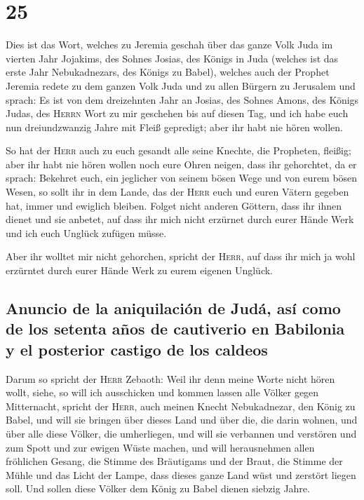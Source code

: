 \hypertarget{section-24}{%
\section{25}\label{section-24}}

 Dies ist das Wort, welches zu Jeremia geschah über das
ganze Volk Juda im vierten Jahr Jojakims, des Sohnes Josias, des Königs
in Juda (welches ist das erste Jahr Nebukadnezars, des Königs zu Babel),
 welches auch der Prophet Jeremia redete zu dem ganzen
Volk Juda und zu allen Bürgern zu Jerusalem und sprach: 
Es ist von dem dreizehnten Jahr an Josias, des Sohnes Amons, des Königs
Judas, des \textsc{Herrn} Wort zu mir geschehen bis auf diesen Tag, und
ich habe euch nun dreiundzwanzig Jahre mit Fleiß gepredigt; aber ihr
habt nie hören wollen.

 So hat der \textsc{Herr} auch zu euch gesandt alle seine
Knechte, die Propheten, fleißig; aber ihr habt nie hören wollen noch
eure Ohren neigen, dass ihr gehorchtet,  da er sprach:
Bekehret euch, ein jeglicher von seinem bösen Wege und von eurem bösen
Wesen, so sollt ihr in dem Lande, das der \textsc{Herr} euch und euren
Vätern gegeben hat, immer und ewiglich bleiben.  Folget
nicht anderen Göttern, dass ihr ihnen dienet und sie anbetet, auf dass
ihr mich nicht erzürnet durch eurer Hände Werk und ich euch Unglück
zufügen müsse.

 Aber ihr wolltet mir nicht gehorchen, spricht der
\textsc{Herr}, auf dass ihr mich ja wohl erzürntet durch eurer Hände
Werk zu eurem eigenen Unglück.

\hypertarget{anuncio-de-la-aniquilaciuxf3n-de-juduxe1-asuxed-como-de-los-setenta-auxf1os-de-cautiverio-en-babilonia-y-el-posterior-castigo-de-los-caldeos}{%
\subsection{Anuncio de la aniquilación de Judá, así como de los setenta
años de cautiverio en Babilonia y el posterior castigo de los
caldeos}\label{anuncio-de-la-aniquilaciuxf3n-de-juduxe1-asuxed-como-de-los-setenta-auxf1os-de-cautiverio-en-babilonia-y-el-posterior-castigo-de-los-caldeos}}

 Darum so spricht der \textsc{Herr} Zebaoth: Weil ihr denn
meine Worte nicht hören wollt,  siehe, so will ich
ausschicken und kommen lassen alle Völker gegen Mitternacht, spricht der
\textsc{Herr}, auch meinen Knecht Nebukadnezar, den König zu Babel, und
will sie bringen über dieses Land und über die, die darin wohnen, und
über alle diese Völker, die umherliegen, und will sie verbannen und
verstören und zum Spott und zur ewigen Wüste machen,  und
will herausnehmen allen fröhlichen Gesang, die Stimme des Bräutigams und
der Braut, die Stimme der Mühle und das Licht der Lampe, 
dass dieses ganze Land wüst und zerstört liegen soll. Und sollen diese
Völker dem König zu Babel dienen siebzig Jahre.

